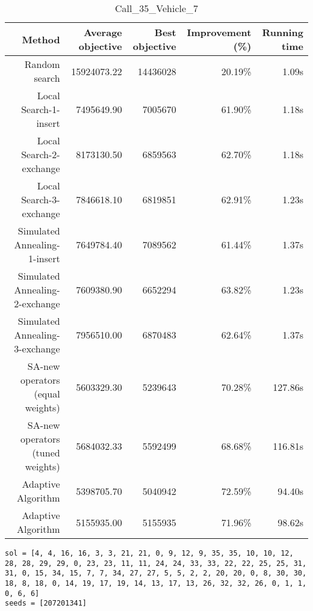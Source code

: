 \begin{table}[ht]
\centering
\caption{Call\_35\_Vehicle\_7}
\label{tab:call35vehicle7}
\begin{tabular}{|r|r|r|r|r|}
Method & Average objective & Best objective & Improvement (\%) & Running time \\
\hline
Random search & 15924073.22 & 14436028 & 20.19\% & 1.09s\\
Local Search-1-insert & 7495649.90 & 7005670 & 61.90\% & 1.18s\\
Local Search-2-exchange & 8173130.50 & 6859563 & 62.70\% & 1.18s\\
Local Search-3-exchange & 7846618.10 & 6819851 & 62.91\% & 1.23s\\
Simulated Annealing-1-insert & 7649784.40 & 7089562 & 61.44\% & 1.37s\\
Simulated Annealing-2-exchange & 7609380.90 & 6652294 & 63.82\% & 1.23s\\
Simulated Annealing-3-exchange & 7956510.00 & 6870483 & 62.64\% & 1.37s\\
SA-new operators (equal weights) & 5603329.30 & 5239643 & 70.28\% & 127.86s\\
SA-new operators (tuned weights) & 5684032.33 & 5592499 & 68.68\% & 116.81s\\
Adaptive Algorithm & 5398705.70 & 5040942 & 72.59\% & 94.40s\\
Adaptive Algorithm & 5155935.00 & 5155935 & 71.96\% & 98.62s\\
\end{tabular}%
\end{table}
\begin{lstlisting}[label={lst:call35vehicle7},caption=Optimal solution call\_35\_vehicle\_7]
sol = [4, 4, 16, 16, 3, 3, 21, 21, 0, 9, 12, 9, 35, 35, 10, 10, 12, 28, 28, 29, 29, 0, 23, 23, 11, 11, 24, 24, 33, 33, 22, 22, 25, 25, 31, 31, 0, 15, 34, 15, 7, 7, 34, 27, 27, 5, 5, 2, 2, 20, 20, 0, 8, 30, 30, 18, 8, 18, 0, 14, 19, 17, 19, 14, 13, 17, 13, 26, 32, 32, 26, 0, 1, 1, 0, 6, 6]
seeds = [207201341]
\end{lstlisting}%
\clearpage


